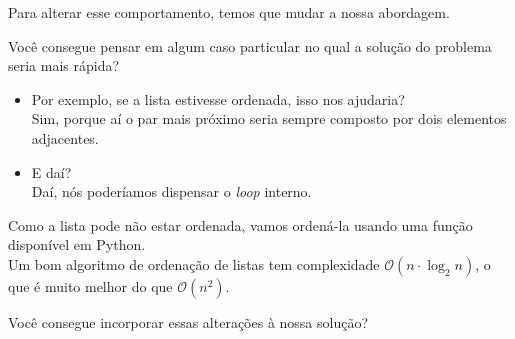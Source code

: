 \documentclass[11pt,a4paper]{article}
\providecommand{\tightlist}{%
      \setlength{\itemsep}{0pt}\setlength{\parskip}{0pt}}
\begin{document}
Para alterar esse comportamento, temos que mudar a nossa abordagem.

    Você consegue pensar em algum caso particular no qual a solução do
problema seria mais rápida?

    \begin{itemize}
\tightlist
\item
  Por exemplo, se a lista estivesse ordenada, isso nos ajudaria?\\
  Sim, porque aí o par mais próximo seria sempre composto por dois
  elementos adjacentes.
\end{itemize}

    \begin{itemize}
\tightlist
\item
  E daí?\\
  Daí, nós poderíamos dispensar o \emph{loop} interno.
\end{itemize}

    Como a lista pode não estar ordenada, vamos ordená-la usando uma função
disponível em Python.\\
Um bom algoritmo de ordenação de listas tem complexidade
\(\mathcal{O}(n \cdot \log_2 n)\), o que é muito melhor do que
\(\mathcal{O}(n^2)\).

    Você consegue incorporar essas alterações à nossa solução?
\end{document}
